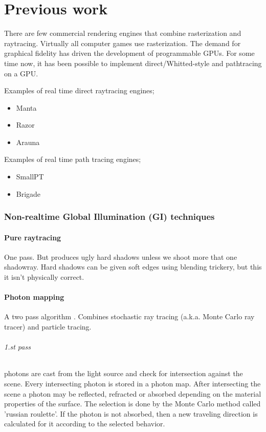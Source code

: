 \part{Previous work}

There are few commercial rendering engines that combine rasterization and raytracing. Virtually all computer games use rasterization. The demand for graphical fidelity has driven the development of programmable GPUs. For some time now, it has been possible to implement direct/Whitted-style and pathtracing on a GPU.

Examples of real time direct raytracing engines; 
\begin{itemize}
	\item Manta
	\item Razor
	\item Arauna
\end{itemize}

Examples of real time path tracing engines; 
\begin{itemize}
	\item SmallPT
	\item Brigade
\end{itemize}

\section {Non-realtime Global Illumination (GI) techniques}
		\subsection{Pure raytracing} 
		One pass. But produces ugly hard shadows unless we shoot more that one shadowray. Hard shadows can be given soft edges using blending trickery, but this it isn't physically correct.
		
	\subsection{Photon mapping} A two pass algorithm \cite{jensen95}. Combines stochastic ray tracing (a.k.a. Monte Carlo ray tracer) and particle tracing.
	\paragraph{1.st pass} photons are cast from the light source and check for intersection against the scene. Every intersecting photon is stored in a photon map. After intersecting the scene a photon may be reflected, refracted or absorbed depending on the material properties of the surface. The selection is done by the Monte Carlo method called 'russian roulette'. If the photon is not absorbed, then a new traveling direction is calculated for it according to the selected behavior.

